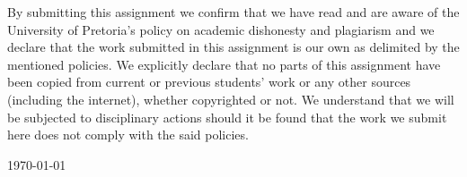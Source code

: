 \begin{titlepage}
\begin{center}
    \end{center}

    \noindent By submitting this assignment we confirm that we have read and are aware of the University of Pretoria's policy on academic dishonesty and plagiarism and we declare that the work submitted in this assignment is our own as delimited by the mentioned policies. We explicitly declare that no parts of this assignment have been copied from current or previous students' work or any other sources (including the internet), whether copyrighted or not. We understand that we will be subjected to disciplinary actions should it be found that the work we submit here does not comply with the said policies.
	
	\vfill
    \begin{center}
		\large\today
    \end{center}

\end{titlepage}